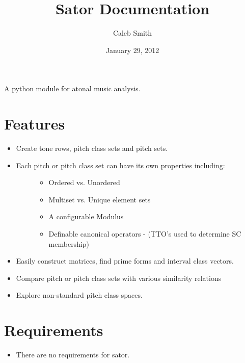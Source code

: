 \documentclass[letterpaper,10pt,english]{sphinxmanual}
\title{Sator Documentation}
\date{January 29, 2012}
\author{Caleb Smith}
\begin{document}
\maketitle
\tableofcontents
{}\label{index::doc}


A python module for atonal music analysis.


\chapter{Features}
\label{index:features}\label{index:sator}\begin{itemize}
\item {} 
Create tone rows, pitch class sets and pitch sets.

\item {} \begin{description}
\item[{Each pitch or pitch class set can have its own properties including:}] \leavevmode\begin{itemize}
\item {} 
Ordered vs. Unordered

\item {} 
Multiset vs. Unique element sets

\item {} 
A configurable Modulus

\item {} 
Definable canonical operators - (TTO's used to determine SC membership)

\end{itemize}

\end{description}

\item {} 
Easily construct matrices, find prime forms and interval class vectors.

\item {} 
Compare pitch or pitch class sets with various similarity relations

\item {} 
Explore non-standard pitch class spaces.

\end{itemize}


\chapter{Requirements}
\label{index:requirements}\begin{itemize}
\item {} 
There are no requirements for sator.

\end{itemize}
\end{document}
